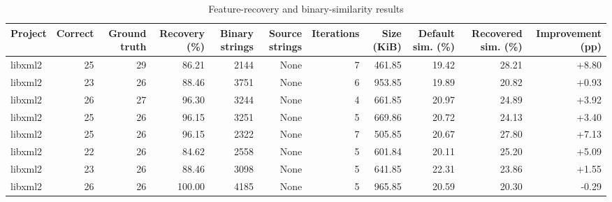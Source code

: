 \begin{table}[htbp]
\centering
\caption{Feature-recovery and binary-similarity results}
\label{tab:feature-recovery-results}
\small
\begin{tabular}{lrrrrrrrrrr}
\toprule
Project & Correct & Ground truth & Recovery (\%) & Binary strings & Source strings & Iterations & Size (KiB) & Default sim. (\%) & Recovered sim. (\%) & Improvement (pp) \\
\midrule
libxml2 & 25 & 29 & 86.21 & 2144 & None & 7 & 461.85 & 19.42 & 28.21 & +8.80 \\
libxml2 & 23 & 26 & 88.46 & 3751 & None & 6 & 953.85 & 19.89 & 20.82 & +0.93 \\
libxml2 & 26 & 27 & 96.30 & 3244 & None & 4 & 661.85 & 20.97 & 24.89 & +3.92 \\
libxml2 & 25 & 26 & 96.15 & 3251 & None & 5 & 669.86 & 20.72 & 24.13 & +3.40 \\
libxml2 & 25 & 26 & 96.15 & 2322 & None & 7 & 505.85 & 20.67 & 27.80 & +7.13 \\
libxml2 & 22 & 26 & 84.62 & 2558 & None & 5 & 601.84 & 20.11 & 25.20 & +5.09 \\
libxml2 & 23 & 26 & 88.46 & 3098 & None & 5 & 641.85 & 22.31 & 23.86 & +1.55 \\
libxml2 & 26 & 26 & 100.00 & 4185 & None & 5 & 965.85 & 20.59 & 20.30 & -0.29 \\
\bottomrule
\end{tabular}
\end{table}
